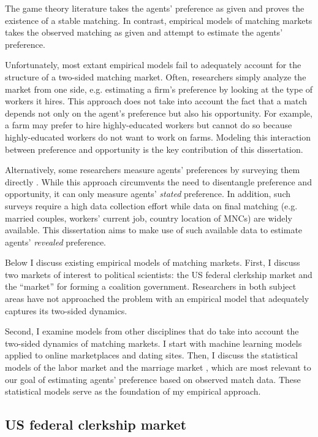 The game theory literature takes the agents' preference as given and proves the
existence of a stable matching. In contrast, empirical models of matching
markets takes the observed matching as given and attempt to estimate the agents'
preference.

Unfortunately, most extant empirical models fail to adequately account for the
structure of a two-sided matching market. Often, researchers simply analyze the
market from one side, e.g. estimating a firm's preference by looking at the type
of workers it hires. This approach does not take into account the fact that a
match depends not only on the agent's preference but also his opportunity. For
example, a farm may prefer to hire highly-educated workers but cannot do so
because highly-educated workers do not want to work on farms. Modeling this
interaction between preference and opportunity is the key contribution of this
dissertation.

Alternatively, some researchers measure agents' preferences by surveying them
directly \citep{Posner2001, Sprecher1994}. While this approach circumvents the
need to disentangle preference and opportunity, it can only measure agents'
\textit{stated} preference. In addition, such surveys require a high data
collection effort while data on final matching (e.g. married couples, workers'
current job, country location of MNCs) are widely available. This dissertation
aims to make use of such available data to estimate agents' \textit{revealed}
preference.

Below I discuss existing empirical models of matching markets. First, I discuss
two markets of interest to political scientists: the US federal clerkship market
and the ``market'' for forming a coalition government. Researchers in both
subject areas have not approached the problem with an empirical model that
adequately captures its two-sided dynamics.

Second, I examine models from other disciplines that do take into account the
two-sided dynamics of matching markets. I start with machine learning models
applied to online marketplaces and dating sites. Then, I discuss the statistical
models of the labor market \citep{Logan1996} and the marriage market
\citep{Logan2008}, which are most relevant to our goal of estimating agents'
preference based on observed match data. These statistical models serve as the
foundation of my empirical approach.

\subsection{US federal clerkship market}

